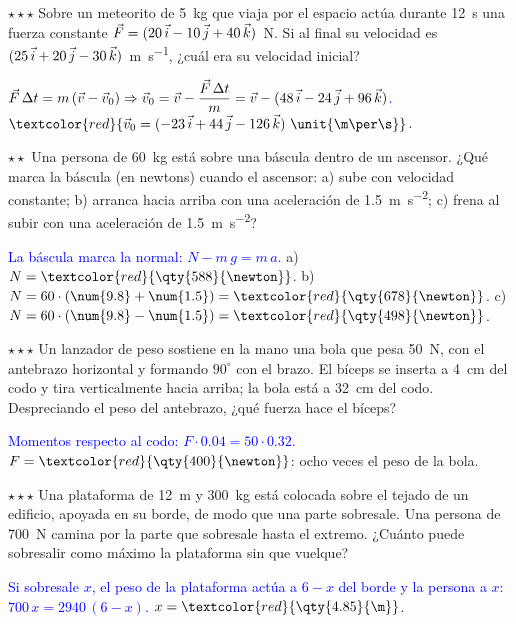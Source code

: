 \begin{exercise}
    \(\star\star\star\) Sobre un meteorito de \qty{5}{\kg} que viaja por el espacio actúa durante \qty{12}{\s} una fuerza constante
    \(\vec{F} = (20\,\vec{i} - 10\,\vec{j} + 40\,\vec{k})\)~N. Si al final su velocidad es \((25\,\vec{i} + 20\,\vec{j} - 30\,\vec{k})\)~\unit{\m\per\s},
    ¿cuál era su velocidad inicial?
    \begin{solu}
        \textcolor{blue}{\(\vec{F}\,\Delta t = m\,(\vec{v} - \vec{v}_0) \Rightarrow \vec{v}_0 = \vec{v} - \dfrac{\vec{F}\,\Delta t}{m} =
        \vec{v} - (48\,\vec{i} - 24\,\vec{j} + 96\,\vec{k})\).}
        \(\textcolor{red}{\vec{v}_0 = (-23\,\ivec + 44\,\jvec - 126\,\kvec)~\unit{\m\per\s}}\).
    \end{solu}
\end{exercise}

\begin{exercise}
    \(\star\star\) Una persona de \qty{60}{\kg} está sobre una báscula dentro de un ascensor. ¿Qué marca la báscula (en newtons)
    cuando el ascensor: a) sube con velocidad constante; b) arranca hacia arriba con una aceleración de \qty{1.5}{\m\per\s\squared};
    c) frena al subir con una aceleración de \qty{1.5}{\m\per\s\squared}?
    \begin{solu}
        \textcolor{blue}{La báscula marca la normal: \(N - m\,g = m\,a\).} a) \(N = \textcolor{red}{\qty{588}{\newton}}\).
        b) \(N = 60 \cdot (\num{9.8} + \num{1.5}) = \textcolor{red}{\qty{678}{\newton}}\). c) \(N = 60 \cdot (\num{9.8} - \num{1.5}) =
        \textcolor{red}{\qty{498}{\newton}}\).
    \end{solu}
\end{exercise}

\begin{exercise}
    \(\star\star\star\) Un lanzador de peso sostiene en la mano una bola que pesa \qty{50}{\newton}, con el antebrazo horizontal y
    formando \(90^\circ\) con el brazo. El bíceps se inserta a \qty{4}{\cm} del codo y tira verticalmente hacia arriba; la bola está a
    \qty{32}{\cm} del codo. Despreciando el peso del antebrazo, ¿qué fuerza hace el bíceps?
    \begin{solu}
        \textcolor{blue}{Momentos respecto al codo: \(F \cdot \num{0.04} = 50 \cdot \num{0.32}\).}
        \(F = \textcolor{red}{\qty{400}{\newton}}\): ocho veces el peso de la bola.
    \end{solu}
\end{exercise}

\begin{exercise}
    \(\star\star\star\) Una plataforma de \qty{12}{\m} y \qty{300}{\kg} está colocada sobre el tejado de un edificio, apoyada en su
    borde, de modo que una parte sobresale. Una persona de \qty{700}{\newton} camina por la parte que sobresale hasta el extremo.
    ¿Cuánto puede sobresalir como máximo la plataforma sin que vuelque?
    \begin{solu}
        \textcolor{blue}{Si sobresale \(x\), el peso de la plataforma actúa a \(6 - x\) del borde y la persona a \(x\): \(700\,x = 2940\,(6 - x)\).}
        \(x = \textcolor{red}{\qty{4.85}{\m}}\).
    \end{solu}
\end{exercise}

